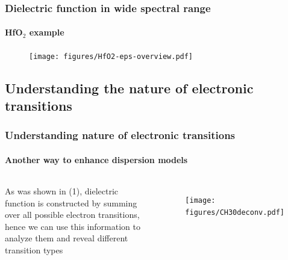 \documentclass{beamer}
\begin{document}
\begin{frame}
    \frametitle{Dielectric function in wide spectral range}
    \framesubtitle{HfO$_2$ example}

    \begin{figure}
	\texttt{[image: figures/HfO2-eps-overview.pdf]}
	\end{figure}

\end{frame}

\subsection{Understanding the nature of electronic transitions}
\begin{frame}
    \frametitle{Understanding nature of electronic transitions}
    \framesubtitle{Another way to enhance dispersion models}

	\begin{columns}[c]
	As was shown in (1), dielectric function is constructed by summing over all possible electron transitions, hence we can use this information to analyze them and reveal different transition types

    \begin{figure}
	\texttt{[image: figures/CH30deconv.pdf]}
	\end{figure}
	\end{columns}

\end{frame}
\end{document}
